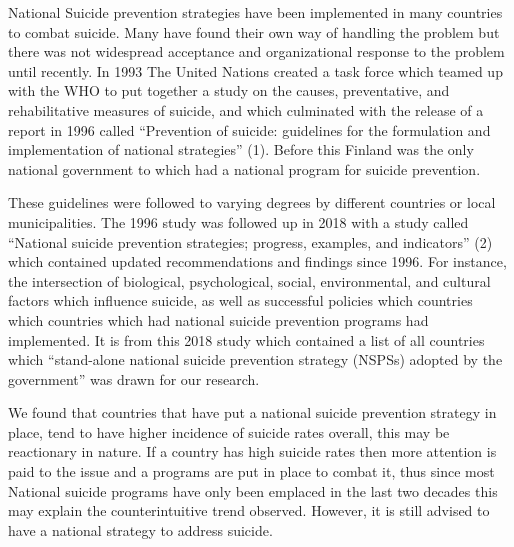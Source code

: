 \documentclass[]{article}
\begin{document}
National Suicide prevention strategies have been implemented in many
countries to combat suicide. Many have found their own way of handling
the problem but there was not widespread acceptance and organizational
response to the problem until recently. In 1993 The United Nations
created a task force which teamed up with the WHO to put together a
study on the causes, preventative, and rehabilitative measures of
suicide, and which culminated with the release of a report in 1996
called ``Prevention of suicide: guidelines for the formulation and
implementation of national strategies'' (1). Before this Finland was the
only national government to which had a national program for suicide
prevention.

These guidelines were followed to varying degrees by different countries
or local municipalities. The 1996 study was followed up in 2018 with a
study called ``National suicide prevention strategies; progress,
examples, and indicators'' (2) which contained updated recommendations
and findings since 1996. For instance, the intersection of biological,
psychological, social, environmental, and cultural factors which
influence suicide, as well as successful policies which countries which
countries which had national suicide prevention programs had
implemented. It is from this 2018 study which contained a list of all
countries which ``stand-alone national suicide prevention strategy
(NSPSs) adopted by the government'' was drawn for our research.

We found that countries that have put a national suicide prevention
strategy in place, tend to have higher incidence of suicide rates
overall, this may be reactionary in nature. If a country has high
suicide rates then more attention is paid to the issue and a programs
are put in place to combat it, thus since most National suicide programs
have only been emplaced in the last two decades this may explain the
counterintuitive trend observed. However, it is still advised to have a
national strategy to address suicide.
\end{document}
